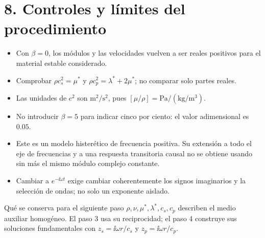 \documentclass[11pt]{article}
\begin{document}
\section*{8. Controles y límites del procedimiento}
\begin{itemize}
 \item Con \(\beta=0\), los módulos y las velocidades vuelven a ser reales
 positivos para el material estable considerado.
 \item Comprobar \(\rho c_s^2=\mu^*\) y
 \(\rho c_p^2=\lambda^*+2\mu^*\); no comparar solo partes reales.
 \item Las unidades de \(c^2\) son \(\mathrm{m^2/s^2}\), pues
 \([\mu/\rho]=\mathrm{Pa}/(\mathrm{kg/m^3})\).
 \item No introducir \(\beta=5\) para indicar cinco por ciento:
 el valor adimensional es \(0.05\).
 \item Este es un modelo histerético de frecuencia positiva. Su extensión a
 todo el eje de frecuencias y a una respuesta transitoria causal no se obtiene
 usando sin más el mismo módulo complejo constante.
 \item Cambiar a \(e^{-\ii\omega t}\) exige cambiar coherentemente los signos
 imaginarios y la selección de ondas; no solo un exponente aislado.
\end{itemize}

\begin{resultado}{Qué se conserva para el siguiente paso}
\(\rho,\nu,\mu^*,\lambda^*,c_s,c_p\) describen el medio auxiliar homogéneo.
El paso 3 usa su reciprocidad; el paso 4 construye sus soluciones
fundamentales con \(z_s=\ii\omega r/c_s\) y \(z_p=\ii\omega r/c_p\).
\end{resultado}
\fuentes
\end{document}
